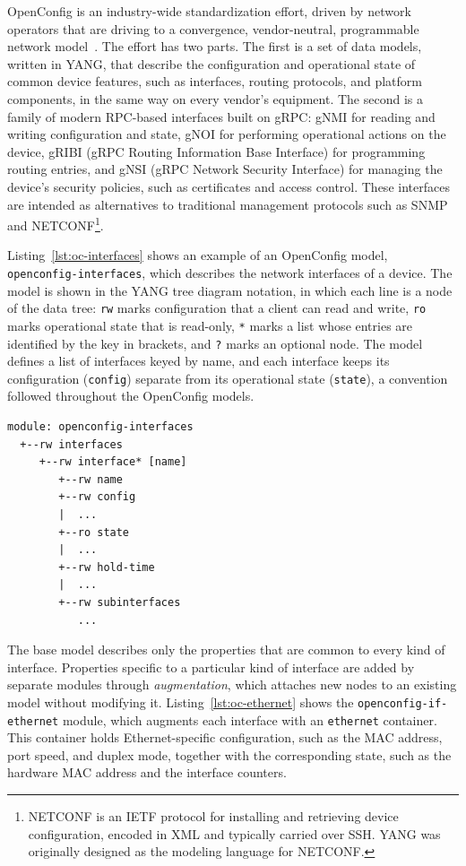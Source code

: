 OpenConfig is an industry-wide standardization effort, driven by network operators that are driving to a convergence, vendor-neutral, programmable network model~\cite{openconfig}. The effort has two parts. The first is a set of data models, written in YANG, that describe the configuration and operational state of common device features, such as interfaces, routing protocols, and platform components, in the same way on every vendor's equipment. The second is a family of modern RPC-based interfaces built on gRPC: gNMI for reading and writing configuration and state, gNOI for performing operational actions on the device, gRIBI (gRPC Routing Information Base Interface) for programming routing entries, and gNSI (gRPC Network Security Interface) for managing the device's security policies, such as certificates and access control. These interfaces are intended as alternatives to traditional management protocols such as SNMP and NETCONF\footnote{NETCONF is an IETF protocol for installing and retrieving device configuration, encoded in XML and typically carried over SSH. YANG was originally designed as the modeling language for NETCONF.}.

Listing~\ref{lst:oc-interfaces} shows an example of an OpenConfig model, \texttt{openconfig-interfaces}, which describes the network interfaces of a device. The model is shown in the YANG tree diagram notation, in which each line is a node of the data tree: \texttt{rw} marks configuration that a client can read and write, \texttt{ro} marks operational state that is read-only, \texttt{*} marks a list whose entries are identified by the key in brackets, and \texttt{?} marks an optional node. The model defines a list of interfaces keyed by name, and each interface keeps its configuration (\texttt{config}) separate from its operational state (\texttt{state}), a convention followed throughout the OpenConfig models.

\begin{lstlisting}[language={},caption={The base OpenConfig model for network interfaces (abridged). Adapted from \cite{systemsapproach}.},label={lst:oc-interfaces}]
module: openconfig-interfaces
  +--rw interfaces
     +--rw interface* [name]
        +--rw name
        +--rw config
        |  ...
        +--ro state
        |  ...
        +--rw hold-time
        |  ...
        +--rw subinterfaces
           ...
\end{lstlisting}

The base model describes only the properties that are common to every kind of interface. Properties specific to a particular kind of interface are added by separate modules through \textit{augmentation}, which attaches new nodes to an existing model without modifying it. Listing~\ref{lst:oc-ethernet} shows the \texttt{openconfig-if-ethernet} module, which augments each interface with an \texttt{ethernet} container. This container holds Ethernet-specific configuration, such as the MAC address, port speed, and duplex mode, together with the corresponding state, such as the hardware MAC address and the interface counters.

